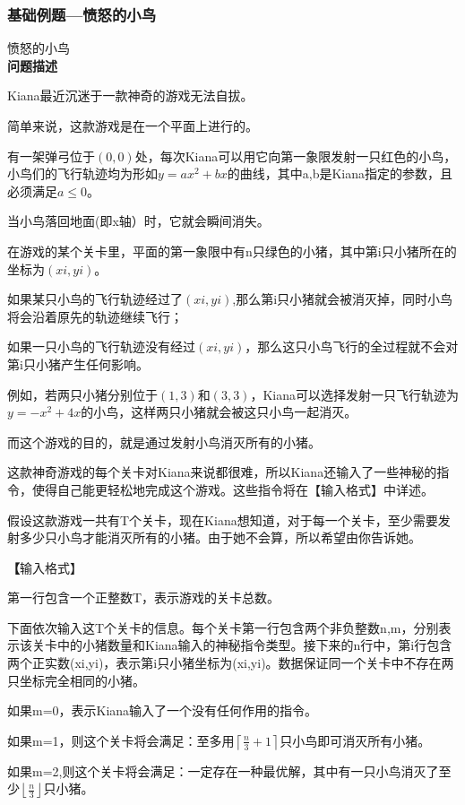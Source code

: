 \subsubsection{基础例题---愤怒的小鸟}
\begin{example}愤怒的小鸟\\
\textbf{问题描述}

Kiana最近沉迷于一款神奇的游戏无法自拔。

简单来说，这款游戏是在一个平面上进行的。

有一架弹弓位于$(0,0)$处，每次Kiana可以用它向第一象限发射一只红色的小鸟，小鸟们的飞行轨迹均为形如$y=ax^2+bx$的曲线，其中a,b是Kiana指定的参数，且必须满足$a\leq 0$。

当小鸟落回地面(即x轴）时，它就会瞬间消失。

在游戏的某个关卡里，平面的第一象限中有n只绿色的小猪，其中第i只小猪所在的坐标为$(xi,yi)$。

如果某只小鸟的飞行轨迹经过了$(xi,yi)$,那么第i只小猪就会被消灭掉，同时小鸟将会沿着原先的轨迹继续飞行；

如果一只小鸟的飞行轨迹没有经过$(xi,yi)$，那么这只小鸟飞行的全过程就不会对第i只小猪产生任何影响。

例如，若两只小猪分别位于$(1,3)$和$(3,3)$，Kiana可以选择发射一只飞行轨迹为$y=-x^2+4x$的小鸟，这样两只小猪就会被这只小鸟一起消灭。

而这个游戏的目的，就是通过发射小鸟消灭所有的小猪。

这款神奇游戏的每个关卡对Kiana来说都很难，所以Kiana还输入了一些神秘的指令，使得自己能更轻松地完成这个游戏。这些指令将在【输入格式】中详述。

假设这款游戏一共有T个关卡，现在Kiana想知道，对于每一个关卡，至少需要发射多少只小鸟才能消灭所有的小猪。由于她不会算，所以希望由你告诉她。

\textbf【输入格式】

第一行包含一个正整数T，表示游戏的关卡总数。

下面依次输入这T个关卡的信息。每个关卡第一行包含两个非负整数n,m，分别表示该关卡中的小猪数量和Kiana输入的神秘指令类型。接下来的n行中，第i行包含两个正实数(xi,yi)，表示第i只小猪坐标为(xi,yi)。数据保证同一个关卡中不存在两只坐标完全相同的小猪。

如果m=0，表示Kiana输入了一个没有任何作用的指令。

如果m=1，则这个关卡将会满足：至多用$\left \lceil \frac{n}{3} + 1 \right \rceil$只小鸟即可消灭所有小猪。

如果m=2,则这个关卡将会满足：一定存在一种最优解，其中有一只小鸟消灭了至少$\left \lfloor \frac{n}{3} \right \rfloor$只小猪。


\end{example}
